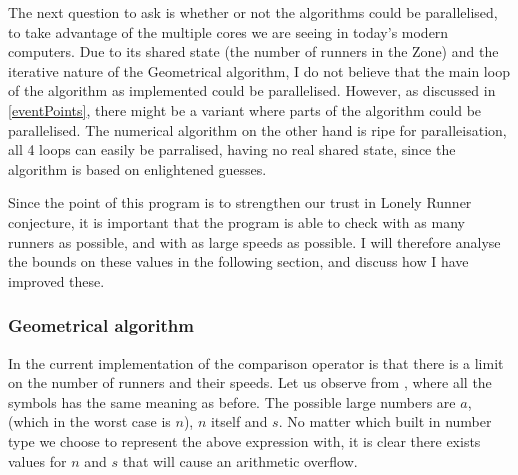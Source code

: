 The next question to ask is whether or not the algorithms could be parallelised, to take advantage of the multiple cores we are seeing in today's modern computers. Due to its shared state (the number of runners in the Zone) and the iterative nature of the Geometrical algorithm, I do not believe that the main loop of the algorithm as implemented could be parallelised. However, as discussed in \ref{eventPoints}, there might be a variant where parts of the algorithm could be parallelised. The numerical algorithm on the other hand is ripe for paralleisation, all 4 loops can easily be parralised, having no real shared state, since the algorithm is based on enlightened guesses.

Since the point of this program is to strengthen our trust in Lonely Runner conjecture, it is important that the program is able to check with as many runners as possible, and with as large speeds as possible. I will therefore analyse the bounds on these values in the following section, and discuss how I have improved these.

\subsubsection{Geometrical algorithm}
In the current implementation of the comparison operator is that there is a limit on the number of runners and their speeds. Let us observe  
 from , where all the symbols has the same meaning as before. The possible large numbers are $a$, (which in the worst case is $n$), $n$ itself and $s$. No matter which built in number type we choose to represent the above expression with, it is clear there exists values for $n$ and $s$ that will cause an arithmetic overflow.


